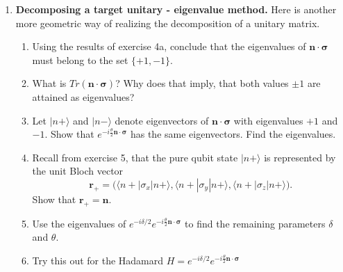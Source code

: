 \documentclass[11pt]{article}
\begin{document}
\begin{enumerate}[label=\textbf{Exercise \arabic*.}, leftmargin=2.2cm]
\item \textbf{Decomposing a target unitary - eigenvalue method.}
Here is another more geometric way of realizing the decomposition of a unitary matrix.
\begin{enumerate}[label=(\alph*)]
\item Using the results of exercise 4a, conclude that the eigenvalues of
$\mathbf n\cdot\boldsymbol{\sigma}$ must belong to the set $\{+1,-1\}$. 
\item What is $Tr(\mathbf n\cdot\boldsymbol{\sigma})$? Why does that imply, that both values $\pm 1$ are attained as eigenvalues?
\item Let $|n+\rangle$ and $|n-\rangle$ denote eigenvectors of
$\mathbf n\cdot\boldsymbol{\sigma}$ with eigenvalues $+1$ and $-1$. Show that $e^{-i\frac{\theta}{2}\mathbf n\cdot\boldsymbol{\sigma}}$ has the same eigenvectors. Find the eigenvalues.

\item Recall from exercise 5, that the pure qubit state $|n+\rangle$ is represented by the unit Bloch vector
\[
\mathbf r_+
=
\bigl(
\langle n+ |\sigma_x|n+\rangle,
\langle n+|\sigma_y|n+\rangle,
\langle n+|\sigma_z|n+\rangle
\bigr).
\]
Show that $\mathbf r_+ = \mathbf n$.

\item Use the eigenvalues of $e^{-i\delta/2}e^{-i\frac\theta2\mathbf n\cdot\boldsymbol\sigma}$ to find the remaining parameters $\delta$ and $\theta$.

\item Try this out for the Hadamard  $H = e^{-i\delta/2}e^{-i\frac\theta2\mathbf n\cdot\boldsymbol\sigma}$

\end{enumerate}

\end{enumerate}
\end{document}
